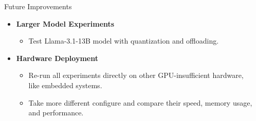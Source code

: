 \documentclass[final]{beamer}
\newlength{\sepwidth}
\newlength{\colwidth}
\newcommand{\separatorcolumn}{\begin{column}{\sepwidth}\end{column}}
\begin{document}
\begin{frame}[t]
\begin{columns}[t]
\begin{column}{\colwidth}
\begin{block}{Future Improvements}
    \begin{itemize}
        \item \textbf{Larger Model Experiments}
        \begin{itemize}
            \item Test Llama-3.1-13B model with quantization and offloading.
        \end{itemize}
    
        \item \textbf{Hardware Deployment}
        \begin{itemize}
            \item Re-run all experiments directly on other GPU-insufficient hardware, like embedded systems.
            \item Take more different configure and compare their speed, memory usage, and performance.
        \end{itemize}
    \end{itemize}
    \vspace{0.35em}
  \end{block}

 \end{column}
 
 \separatorcolumn
\end{columns}
\end{frame}
\end{document}
